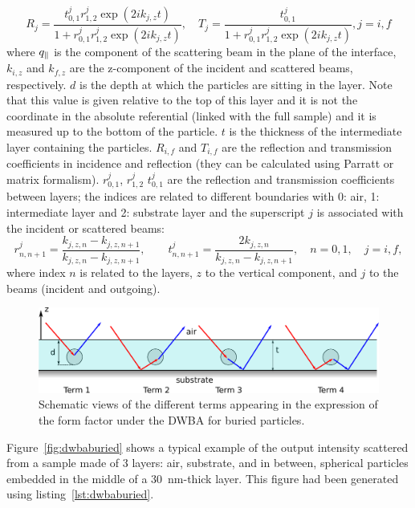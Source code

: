 \begin{equation*}
R_j =\frac{t^{j}_{0,1}r^{j}_{1,2}\exp(2ik_{j,z}t)}{1+r^{j}_{0,1}r^{j}_{1,2}\exp(2ik_{j,z}t)}, \quad T_j=\frac{t^{j}_{0,1}}{1+r^{j}_{0,1}r^{j}_{1,2}\exp(2ik_{j,z}t)}, j=i,f
\end{equation*}
where $q_{\parallel}$ is the component of the scattering beam in the plane of the interface, $k_{i,z}$ and $k_{f,z}$ are the z-component of the incident and scattered beams, respectively.  $d$ is the depth at which the particles are sitting in the layer. Note that this value is given relative to the top of this layer and it is not the coordinate in the absolute referential (linked with the full sample) and it is measured up to the bottom of the particle. $t$ is the thickness of the intermediate layer containing the particles. $R_{i,f}$ and $T_{i,f}$  are the reflection  and transmission coefficients in incidence and reflection (they can be calculated using Parratt or matrix formalism). $r^j_{0,1}$, $r^j_{1,2}$ $t^j_{0,1}$ are the reflection and transmission coefficients between layers; the indices are related to different boundaries with 0: air, 1: intermediate layer and 2: substrate layer and the superscript $j$ is associated with the incident or scattered beams:
\begin{equation*}
r^j_{n,n+1}=\frac{k_{j,z,n}-k_{j,z,n+1}}{k_{j,z,n}-k_{j,z,n+1}}, \qquad t^j_{n,n+1}= \frac{2k_{j,z,n}}{k_{j,z,n}-k_{j,z,n+1}}, \quad n=0,1, \quad j=i,f,
\end{equation*}
where index $n$ is related to the layers, $z$ to the vertical component, and $j$ to the beams (incident and outgoing).

\begin{figure}[tb]
\begin{center}
\includegraphics[width=\textwidth]{fig/drawing/drawingDWBAburied.pdf}
\end{center}
\caption{Schematic views of the different terms appearing in the expression of the form factor under the DWBA for buried particles.}
\label{fig:SchemDWBAburied}
\end{figure}


Figure~\ref{fig:dwbaburied} shows a typical example of the output intensity scattered from a sample made of 3 layers: air, substrate, and in between, spherical particles embedded in the middle of a 30~nm-thick layer. This figure had been generated using listing~\ref{lst:dwbaburied}.

